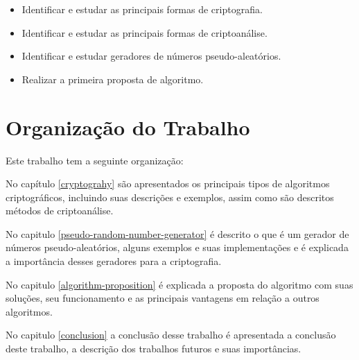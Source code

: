 \begin{itemize}
	\item Identificar e estudar as principais formas de criptografia.
	\item Identificar e estudar as principais formas de criptoanálise.
	\item Identificar e estudar geradores de números pseudo-aleatórios.
	\item Realizar a primeira proposta de algoritmo.
\end{itemize}

\section{Organização do Trabalho}
\label{paper-organization}

Este trabalho tem a seguinte organização:

No capítulo \ref{cryptograhy} são apresentados os principais tipos de algoritmos criptográficos, incluindo suas descrições e exemplos, assim como são descritos métodos de criptoanálise.

No capitulo \ref{pseudo-random-number-generator} é descrito o que é um gerador de números pseudo-aleatórios, alguns exemplos e suas implementações e é explicada a importância desses geradores para a criptografia. 

No capitulo \ref{algorithm-proposition} é explicada a proposta do algoritmo com suas soluções, seu funcionamento e as principais vantagens em relação a outros algoritmos.

No capitulo \ref{conclusion} a conclusão desse trabalho é apresentada a conclusão deste trabalho, a descrição dos trabalhos futuros e suas importâncias.
